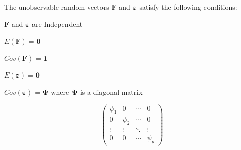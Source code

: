 \documentclass[12pt]{article}
\numberwithin{equation}{section}
\begin{document}
\noindent The unobservable random vectors $\mathbf{F}$ and $\boldsymbol{\varepsilon}$ satisfy the following conditions:
\begin{bracketedromanenum}
	\item  $\mathbf{F}$ and $\boldsymbol{\varepsilon}$ are Independent\\
	\item $E(\mathbf{F})= \mathbf{0}$\\
	\item  $Cov(\mathbf{F})= \mathbf{1}$\\
	\item  $E(\boldsymbol{\varepsilon})= \mathbf{0}$\\
	\item  $Cov(\boldsymbol{\varepsilon})= \boldsymbol{\Psi} $ where $\boldsymbol{\Psi}$ is a diagonal matrix
	
	$$\begin{pmatrix}
		\psi_{1} & 0 & \cdots & 0 \\
		0 & \psi_{2} & \cdots & 0 \\
		\vdots & \vdots & \ddots & \vdots \\
		0 & 0 & \cdots & \psi_{p}
	\end{pmatrix}$$
\end{bracketedromanenum}
\end{document}
